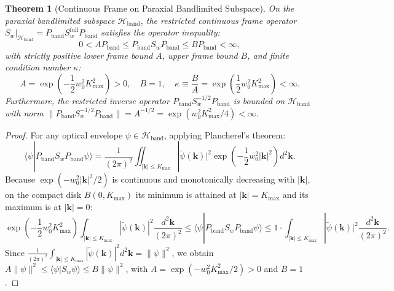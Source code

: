 \documentclass[11pt,a4paper]{article}
\newtheorem{theorem}{Theorem}
\begin{document}
\begin{theorem}[Continuous Frame on Paraxial Bandlimited Subspace]
\label{thm:frame_bounds}
On the paraxial bandlimited subspace $\mathcal{H}_{\text{band}}$, the restricted continuous frame operator $S_w|_{\mathcal{H}_{\text{band}}} = P_{\text{band}} S_w^{\text{full}} P_{\text{band}}$ satisfies the operator inequality:
\begin{equation}
\boxed{0 < A P_{\text{band}} \le P_{\text{band}} S_w P_{\text{band}} \le B P_{\text{band}} < \infty,}
\label{eq:thm3_frame_bounds}
\end{equation}
with strictly positive lower frame bound $A$, upper frame bound $B$, and finite condition number $\kappa$:
\begin{equation}
A = \exp\left( - \frac{1}{2} w_0^2 K_{\max}^2 \right) > 0, \quad B = 1, \quad \kappa \equiv \frac{B}{A} = \exp\left( \frac{1}{2} w_0^2 K_{\max}^2 \right) < \infty.
\label{eq:thm3_condition_number}
\end{equation}
Furthermore, the restricted inverse operator $P_{\text{band}} S_w^{-1/2} P_{\text{band}}$ is bounded on $\mathcal{H}_{\text{band}}$ with norm $\|P_{\text{band}} S_w^{-1/2} P_{\text{band}}\| = A^{-1/2} = \exp(w_0^2 K_{\max}^2 / 4) < \infty$.
\end{theorem}

\begin{proof}
For any optical envelope $\psi \in \mathcal{H}_{\text{band}}$, applying Plancherel's theorem:
\begin{equation}
\langle \psi | P_{\text{band}} S_w P_{\text{band}} \psi \rangle = \frac{1}{(2\pi)^2} \iint_{|\mathbf{k}| \le K_{\max}} |\widetilde{\psi}(\mathbf{k})|^2 \exp\left( - \frac{1}{2} w_0^2 |\mathbf{k}|^2 \right) d^2\mathbf{k}.
\label{eq:plancherel_frame}
\end{equation}
Because $\exp(-w_0^2 |\mathbf{k}|^2 / 2)$ is continuous and monotonically decreasing with $|\mathbf{k}|$, on the compact disk $B(0, K_{\max})$ its minimum is attained at $|\mathbf{k}| = K_{\max}$ and its maximum is at $|\mathbf{k}| = 0$:
\begin{equation}
\exp\left( - \frac{1}{2} w_0^2 K_{\max}^2 \right) \int_{|\mathbf{k}| \le K_{\max}} |\widetilde{\psi}(\mathbf{k})|^2 \frac{d^2\mathbf{k}}{(2\pi)^2} \le \langle \psi | P_{\text{band}} S_w P_{\text{band}} \psi \rangle \le 1 \cdot \int_{|\mathbf{k}| \le K_{\max}} |\widetilde{\psi}(\mathbf{k})|^2 \frac{d^2\mathbf{k}}{(2\pi)^2}.
\label{eq:frame_bounds_sandwiched}
\end{equation}
Since $\frac{1}{(2\pi)^2} \int_{|\mathbf{k}| \le K_{\max}} |\widetilde{\psi}(\mathbf{k})|^2 d^2\mathbf{k} = \|\psi\|^2$, we obtain $A \|\psi\|^2 \le \langle \psi | S_w \psi \rangle \le B \|\psi\|^2$, with $A = \exp(-w_0^2 K_{\max}^2 / 2) > 0$ and $B = 1$.
\end{proof}
\end{document}
